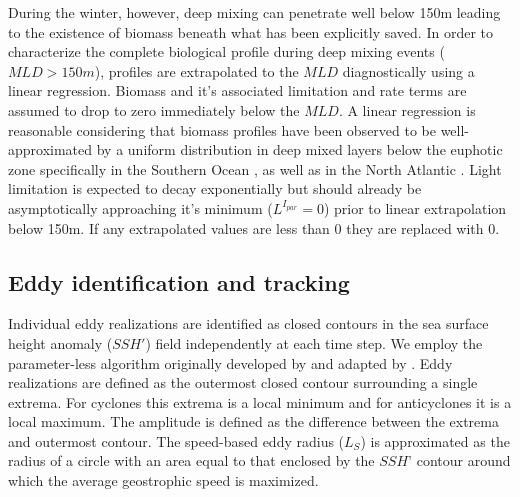 \documentclass{article}
\begin{document}
During the winter, however, deep mixing can penetrate well below 150m leading to the existence of biomass beneath what has been explicitly saved. In order to characterize the complete biological profile during deep mixing events ($MLD>150m$), profiles are extrapolated to the $MLD$ diagnostically using a linear regression. Biomass and it's associated limitation and rate terms are assumed to drop to zero immediately below the $MLD$. A linear regression is reasonable considering that biomass profiles have been observed to be well-approximated by a uniform distribution in deep mixed layers below the euphotic zone specifically in the Southern Ocean \parencite{UitzVerticaldistributionphytoplankton2006}, as well as in the North Atlantic \parencite{Bosssituevaluationinitiation2010,BehrenfeldAnnualcyclesecological2013}. Light limitation is expected to decay exponentially \textcite{Geiderdynamicregulatorymodel1998} but should already be asymptotically approaching it's minimum ($L^{I_{par}}=0$) prior to linear extrapolation below 150m. If any extrapolated values are less than 0 they are replaced with 0.  




\subsection{Eddy identification and tracking}

Individual eddy realizations are identified as closed contours in the sea surface height anomaly ($SSH'$) field independently at each time step. We employ the parameter-less algorithm originally developed by \textcite{CheltonGlobalobservationsnonlinear2011} and adapted by \textcite{Faghmousdailyglobalmesoscale2015}. Eddy realizations are defined as the outermost closed contour surrounding a single extrema. For cyclones this extrema is a local minimum and for anticyclones it is a local maximum. The amplitude is defined as the difference between the extrema and outermost contour. The speed-based eddy radius ($L_S$) is approximated as the radius of a circle with an area equal to that enclosed by the $SSH’$ contour around which the average geostrophic speed is maximized. 
\end{document}
